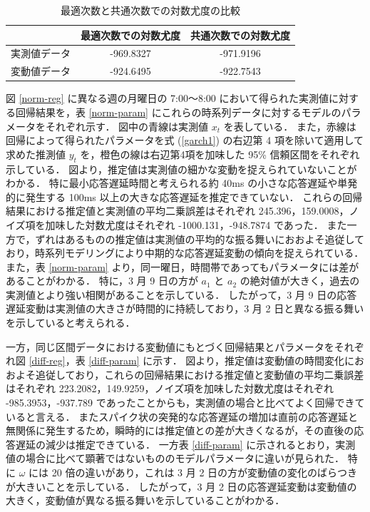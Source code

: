 \documentclass[technicalreport]{ieicej}
\begin{document}
\begin{table}[tb]
\centering
\caption{最適次数と共通次数での対数尤度の比較}
\label{more-param}
\begin{tabular}{|l|c|c|}
\hline
&最適次数での対数尤度&共通次数での対数尤度\\
\hline
実測値データ&-969.8327&-971.9196\\
\hline
変動値データ&-924.6495&-922.7543\\
\hline
\end{tabular}
\end{table}

図 \ref{norm-reg} に異なる週の月曜日の 7:00～8:00 において得られた実測値に対する回帰結果を，表 \ref{norm-param} にこれらの時系列データに対するモデルのパラメータをそれぞれ示す．
図中の青線は実測値 $x_t$ を表している．
また，赤線は回帰によって得られたパラメータを式 (\ref{garch1}) の右辺第 4 項を除いて適用して求めた推測値 $y_t$ を，橙色の線は右辺第4項を加味した 95\% 信頼区間をそれぞれ示している．
図より，推定値は実測値の細かな変動を捉えられていないことがわかる．
特に最小応答遅延時間と考えられる約 40ms の小さな応答遅延や単発的に発生する 100ms 以上の大きな応答遅延を推定できていない．
これらの回帰結果における推定値と実測値の平均二乗誤差はそれぞれ 245.396，159.0008，ノイズ項を加味した対数尤度はそれぞれ -1000.131，-948.7874 であった．
また一方で，ずれはあるものの推定値は実測値の平均的な振る舞いにおおよそ追従しており，時系列モデリングにより中期的な応答遅延変動の傾向を捉えられている．
また，表 \ref{norm-param} より，同一曜日，時間帯であってもパラメータには差があることがわかる．
特に，3 月 9 日の方が $a_1$ と $a_2$ の絶対値が大きく，過去の実測値とより強い相関があることを示している．
したがって，3 月 9 日の応答遅延変動は実測値の大きさが時間的に持続しており，3 月 2 日と異なる振る舞いを示していると考えられる．

一方，同じ区間データにおける変動値にもとづく回帰結果とパラメータをそれぞれ図 \ref{diff-reg}，表 \ref{diff-param} に示す．
図より，推定値は変動値の時間変化におおよそ追従しており，これらの回帰結果における推定値と変動値の平均二乗誤差はそれぞれ 223.2082，149.9259，ノイズ項を加味した対数尤度はそれぞれ -985.3953，-937.789 であったことからも，実測値の場合と比べてよく回帰できていると言える．
またスパイク状の突発的な応答遅延の増加は直前の応答遅延と無関係に発生するため，瞬時的には推定値との差が大きくなるが，その直後の応答遅延の減少は推定できている．
一方表 \ref{diff-param} に示されるとおり，実測値の場合に比べて顕著ではないもののモデルパラメータに違いが見られた．
特に $\omega$ には 20 倍の違いがあり，これは 3 月 2 日の方が変動値の変化のばらつきが大きいことを示している．
したがって，3 月 2 日の応答遅延変動は変動値の大きく，変動値が異なる振る舞いを示していることがわかる．
\end{document}
